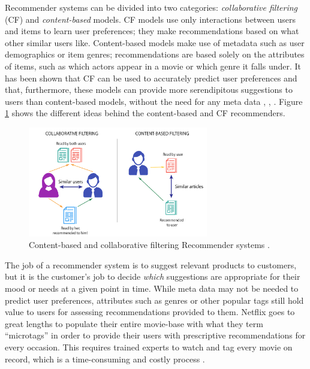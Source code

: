 Recommender systems can be divided into two categories: \textit{collaborative filtering} (CF) and \textit{content-based} models. CF models use only interactions between users and items to learn user preferences; they make recommendations based on what other similar users like. Content-based models make use of metadata such as user demographics or item genres; recommendations are based solely on the attributes of items, such as which actors appear in a movie or which genre it falls under. It has been shown that CF can be used to accurately predict user preferences and that, furthermore, these models can provide more serendipitous suggestions to users than content-based models, without the need for any meta data \parencite{handbook_1.5_cf}, \parencite{handbook_1.3_content-based}, \parencite{handbook_1.8_evaluation}. Figure \ref{fig:1_content-cf} shows the different ideas behind the content-based and CF recommenders.

\begin{figure}[H]
\centering
\includegraphics[width=0.7\textwidth]{Figures/1_content-based-vs-CF.png}
\decoRule
\caption[Types of recommender systems]{Content-based and collaborative filtering Recommender systems \parencite{mohamed2019recommender}.}
\label{fig:1_content-cf}
\end{figure}

The job of a recommender system is to suggest relevant products to customers, but it is the customer's job to decide \textit{which} suggestions are appropriate for their mood or needs at a given point in time. While meta data may not be needed to predict user preferences, attributes such as genres or other popular tags still hold value to users for assessing recommendations provided to them. Netflix goes to great lengths to populate their entire movie-base with what they term ``microtags'' in order to provide their users with prescriptive recommendations for every occasion. This requires trained experts to watch and tag every movie on record, which is a time-consuming and costly process \parencite{atlantic2014genres}.


